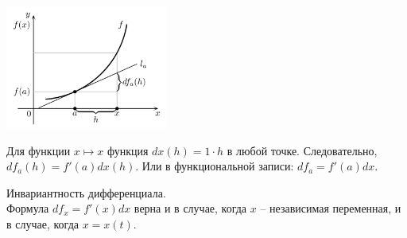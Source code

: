     \begin{center}
        \includegraphics[width=0.4\textwidth]{none5.png}
    \end{center}
    
    Для функции $x \mapsto x$ функция $dx(h) = 1\cdot h$ в любой точке. Следовательно, $df_{a}(h) = f'(a)dx(h)$. Или в функциональной записи: $df_{a}=f'(a)dx$.
    
    \begin{note}{Инвариантность дифференциала.}\\
        Формула $df_{x} = f'(x)dx$ верна и в случае, когда $x$ -- независимая переменная, и в случае, когда $x = x(t)$.
    \end{note}